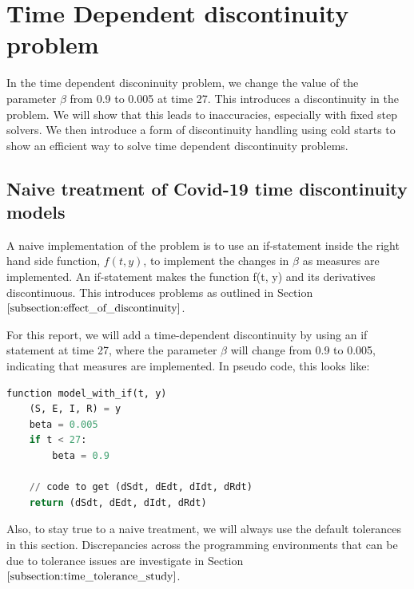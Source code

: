 
\section{Time Dependent discontinuity problem}
\label{section:time_problem}
In the time dependent disconinuity problem, we change the value of the parameter $\beta$ from 0.9 to 0.005 at time 27. This introduces a discontinuity in the problem. We will show that this leads to inaccuracies, especially with fixed step solvers. We then introduce a form of discontinuity handling using cold starts to show an efficient way to solve time dependent discontinuity problems.

\subsection{Naive treatment of Covid-19 time discontinuity models}
\label{subsection:naive_time_problem}
A naive implementation of the problem is to use an if-statement inside the right hand side function, $f(t, y)$, to implement the changes in $\beta$ as measures are implemented. An if-statement makes the function f(t, y) and its derivatives discontinuous. This introduces problems as outlined in Section $\ref{subsection:effect_of_discontinuity}$.

For this report, we will add a time-dependent discontinuity by using an if statement at time 27, where the parameter $\beta$ will change from 0.9 to 0.005, indicating that measures are implemented. In pseudo code, this looks like:

\begin{minipage}{\linewidth}
\begin{lstlisting}[language=Python]
function model_with_if(t, y)
    (S, E, I, R) = y
    beta = 0.005
    if t < 27:
        beta = 0.9
           	
    // code to get (dSdt, dEdt, dIdt, dRdt)
    return (dSdt, dEdt, dIdt, dRdt)
\end{lstlisting}
\end{minipage}

Also, to stay true to a naive treatment, we will always use the default tolerances in this section. Discrepancies across the programming environments that can be due to tolerance issues are investigate in Section $\ref{subsection:time_tolerance_study}$.
 
